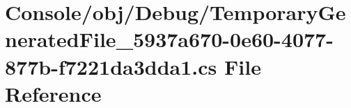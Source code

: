 \hypertarget{_console_2obj_2_debug_2_temporary_generated_file__5937a670-0e60-4077-877b-f7221da3dda1_8cs}{}\section{Console/obj/\+Debug/\+Temporary\+Generated\+File\+\_\+5937a670-\/0e60-\/4077-\/877b-\/f7221da3dda1.cs File Reference}
\label{_console_2obj_2_debug_2_temporary_generated_file__5937a670-0e60-4077-877b-f7221da3dda1_8cs}
